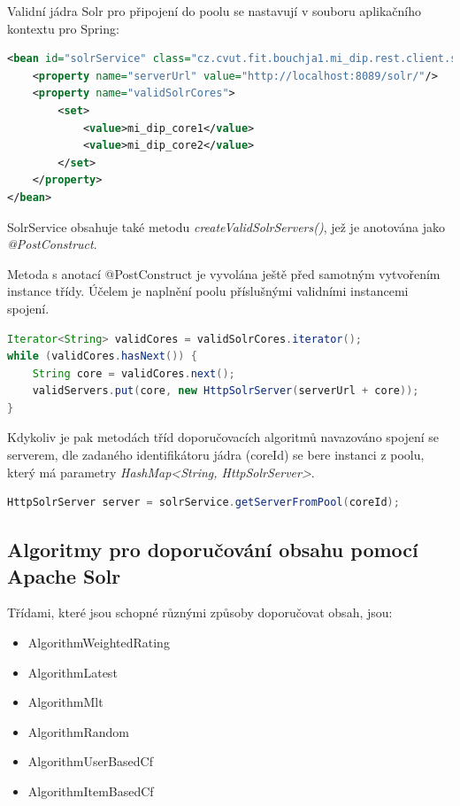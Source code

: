 \documentclass[thesis=M,czech]{FITthesis}[2014/05/07]
\begin{document}
Validní jádra Solr pro připojení do poolu se nastavují v souboru aplikačního kontextu pro Spring:

\begin{lstlisting}[language=xml]
<bean id="solrService" class="cz.cvut.fit.bouchja1.mi_dip.rest.client.solr.SolrService">
    <property name="serverUrl" value="http://localhost:8089/solr/"/>
    <property name="validSolrCores">
        <set>
            <value>mi_dip_core1</value>
            <value>mi_dip_core2</value>
        </set>
    </property>        
</bean>  
\end{lstlisting}

SolrService obsahuje také metodu \emph{createValidSolrServers()}, jež je anotována jako \emph{@PostConstruct}.

Metoda s anotací @PostConstruct je vyvolána ještě před samotným vytvořením instance třídy. Účelem je naplnění poolu příslušnými validními instancemi spojení.

\begin{lstlisting}[language=java]
Iterator<String> validCores = validSolrCores.iterator();
while (validCores.hasNext()) {
    String core = validCores.next();
    validServers.put(core, new HttpSolrServer(serverUrl + core));
}
\end{lstlisting}

Kdykoliv je pak metodách tříd doporučovacích algoritmů navazováno spojení se serverem, dle zadaného identifikátoru jádra (coreId) se bere instanci z poolu, který má parametry \emph{HashMap<String, HttpSolrServer>}. 

\begin{lstlisting}[language=java]
HttpSolrServer server = solrService.getServerFromPool(coreId);
\end{lstlisting}

\subsection{Algoritmy pro doporučování obsahu pomocí Apache Solr}
\label{sec:alg}
Třídami, které jsou schopné různými způsoby doporučovat obsah, jsou:

\begin{itemize}
	\item AlgorithmWeightedRating
	\item AlgorithmLatest
	\item AlgorithmMlt
	\item AlgorithmRandom
	\item AlgorithmUserBasedCf
	\item AlgorithmItemBasedCf				
\end{itemize}
\end{document}

